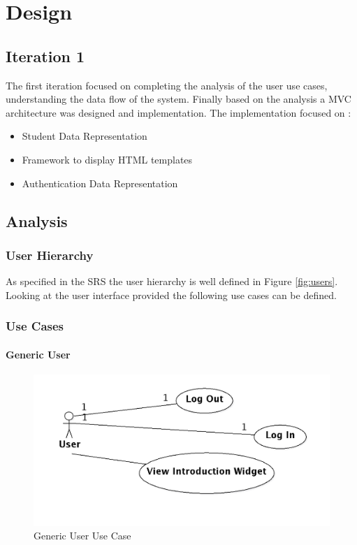 \documentclass{journal}
\begin{document}
\chapter{Design}
\section{Iteration 1}

The first iteration focused on completing the analysis of the user use cases, understanding the data flow of the system. Finally based on the analysis a MVC architecture was designed and implementation. The implementation focused on :

\begin{itemize}
\item Student Data Representation 
\item Framework to display HTML templates
\item Authentication Data Representation 
\end{itemize}

\section{Analysis}

\subsection{User Hierarchy}
As specified in the SRS the user hierarchy is well defined in Figure \ref{fig:users}. Looking at the user interface provided the following use cases can be 
defined.

\subsection{Use Cases}

\subsubsection{Generic User}

\begin{figure}[htp]
\centering
\includegraphics[scale=0.25]{diagrams/use_cases/User_uc.png}
\caption{Generic User Use Case}
\label{fig:UserLog}
\end{figure}
\end{document}
